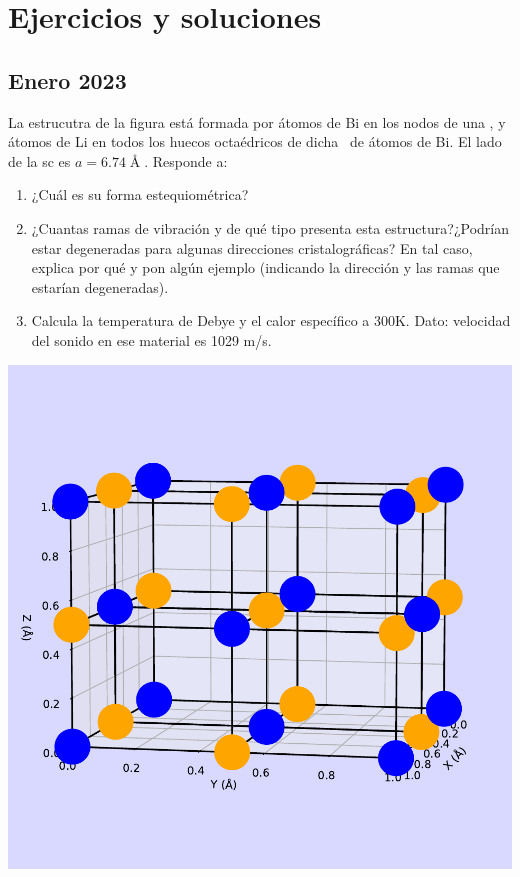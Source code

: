 \chapter{Ejercicios y soluciones}




\section{Enero 2023}
\setcounter{section}{1} %


\begin{ejercicio}
	La estrucutra de la figura está formada por átomos de Bi en los nodos de una \fcc, y átomos de Li en todos los huecos octaédricos de dicha \fcc \ de átomos de Bi. El lado de la sc es $a=6.74 \unit{\Angstrom}$. Responde a:
	\begin{enumerate}[label=\alph*)]
		\item ¿Cuál es su forma estequiométrica?
		\item ¿Cuantas ramas de vibración y de qué tipo presenta esta estructura?¿Podrían estar degeneradas para algunas direcciones cristalográficas? En tal caso, explica por qué y pon algún ejemplo (indicando la dirección y las ramas que estarían degeneradas).
		\item Calcula la temperatura de Debye y el calor específico a 300K. Dato: velocidad del sonido en ese material es 1029 m/s. 
	\end{enumerate}
	\begin{center}
		\includegraphics[scale=0.5]{Imagenes/2023-Enero-01.pdf}
	\end{center}
		
\end{ejercicio}	

